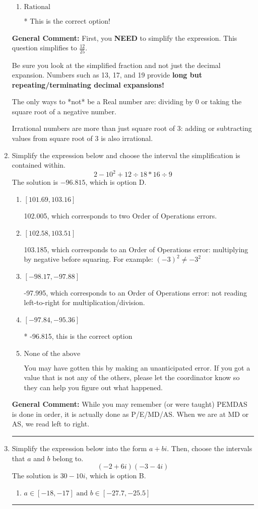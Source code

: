 \documentclass{extbook}[14pt]
\newcommand{\litem}[1]{\item #1

\rule{\textwidth}{0.4pt}}
\begin{document}
\begin{enumerate}
{\begin{enumerate}[label=\Alph*.]
These are the counting numbers with 0 (0, 1, 2, 3, ...)
\item \( \text{Rational} \)

* This is the correct option!
\end{enumerate}

\textbf{General Comment:} First, you \textbf{NEED} to simplify the expression. This question simplifies to $\frac{12}{25}$. 
 
 Be sure you look at the simplified fraction and not just the decimal expansion. Numbers such as 13, 17, and 19 provide \textbf{long but repeating/terminating decimal expansions!} 
 
 The only ways to *not* be a Real number are: dividing by 0 or taking the square root of a negative number. 
 
 Irrational numbers are more than just square root of 3: adding or subtracting values from square root of 3 is also irrational.
}
\litem{
Simplify the expression below and choose the interval the simplification is contained within.
\[ 2 - 10^2 + 12 \div 18 * 16 \div 9 \]The solution is \( -96.815 \), which is option D.\begin{enumerate}[label=\Alph*.]
\item \( [101.69, 103.16] \)

 102.005, which corresponds to two Order of Operations errors.
\item \( [102.58, 103.51] \)

 103.185, which corresponds to an Order of Operations error: multiplying by negative before squaring. For example: $(-3)^2 \neq -3^2$
\item \( [-98.17, -97.88] \)

 -97.995, which corresponds to an Order of Operations error: not reading left-to-right for multiplication/division.
\item \( [-97.84, -95.36] \)

* -96.815, this is the correct option
\item \( \text{None of the above} \)

 You may have gotten this by making an unanticipated error. If you got a value that is not any of the others, please let the coordinator know so they can help you figure out what happened.
\end{enumerate}

\textbf{General Comment:} While you may remember (or were taught) PEMDAS is done in order, it is actually done as P/E/MD/AS. When we are at MD or AS, we read left to right.
}
\litem{
Simplify the expression below into the form $a+bi$. Then, choose the intervals that $a$ and $b$ belong to.
\[ (-2 + 6 i)(-3 - 4 i) \]The solution is \( 30 - 10 i \), which is option B.\begin{enumerate}[label=\Alph*.]
\item \( a \in [-18, -17] \text{ and } b \in [-27.7, -25.5] \)


\end{enumerate}}
\end{enumerate}
\end{document}
